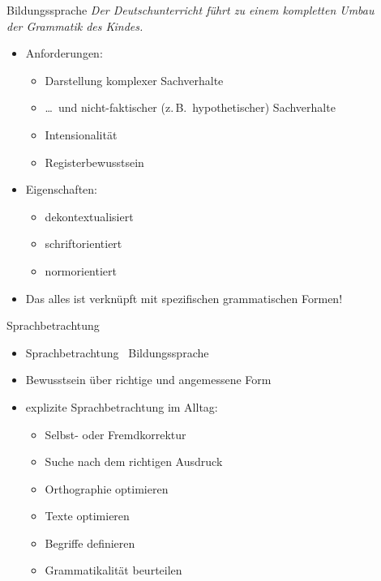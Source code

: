\begin{frame}
  {Bildungssprache}
  \onslide<+->
  \onslide<+->
  \alert{\textit{Der Deutschunterricht führt zu einem kompletten Umbau\\
  der Grammatik des Kindes.}} \\
  \Zeile
  \begin{itemize}[<+->]
    \item Anforderungen:
    \begin{itemize}[<+->]
      \item Darstellung komplexer Sachverhalte
      \item \dots\ und nicht-faktischer (z.\,B.\ hypothetischer) Sachverhalte
      \item Intensionalität
      \item Registerbewusstsein
    \end{itemize}
        \Zeile
      \item Eigenschaften:
    \begin{itemize}[<+->]
      \item dekontextualisiert
      \item schriftorientiert
      \item normorientiert
    \end{itemize}
        \Halbzeile
      \item \alert{Das alles ist verknüpft mit spezifischen grammatischen Formen!}
  \end{itemize}
\end{frame}

\begin{frame}
  {Sprachbetrachtung}
  \onslide<+->
  \begin{itemize}[<+->]
    \item \alert{Sprachbetrachtung \ Bildungssprache}
     \Zeile 
    \item Bewusstsein über richtige und angemessene Form
     \Zeile 
    \item explizite Sprachbetrachtung im Alltag:
      \Halbzeile
      \begin{itemize}[<+->]
        \item Selbst- oder Fremdkorrektur
        \item Suche nach dem richtigen Ausdruck
        \item Orthographie optimieren
        \item Texte optimieren
        \item Begriffe definieren
        \item Grammatikalität beurteilen
      \end{itemize}
  \end{itemize}
\end{frame}

